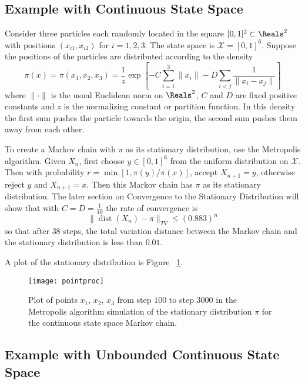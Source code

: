 \documentclass[12pt]{article}
\begin{document}
\subsection*{Example with Continuous State Space}

Consider three particles each randomly located in the square \( [0,1]^2
\subset \Reals^2 \) with positions \( (x_{i1}, x_{i2}) \) for \( i =
1,2,3 \). The state space is \( \mathcal{X} = [0,1]^6 \).  Suppose the
positions of the particles are distributed according to the density
\[
    \pi(x) = \pi(x_1,x_2,x_3) = \frac{1}{z} \exp\left[ -C \sum\limits_{i=1}^3
    \|x_i\| - D \sum\limits_{i<j} \frac{1}{\| x_i - x_j \|} \right]
\] where \( \| \cdot \| \) is the usual Euclidean norm on \( \Reals^2 \),
\( C \) and \( D \) are fixed positive constants and \( z \) is the
normalizing constant or partition function.  In this density the first
sum pushes the particle towards the origin, the second sum pushes them
away from each other.

To create a Markov chain with \( \pi \) as its stationary distribution,
use the Metropolis algorithm. Given \( X_n \), first choose \( y \in [0,1]^6
\) from the uniform distribution on \( \mathcal{X} \).  Then with
probability \( r = \min[1, \pi(y)/\pi(x)] \), accept \( X_{n+1} = y \),
otherwise reject \( y \) and \( X_{n+1} = x \).  Then this Markov chain
has \( \pi \) as its stationary distribution.  The later section on
Convergence to the Stationary Distribution will show that with \( C = D
= \frac{1}{10} \) the rate of convergence is
\[
    \|
    \operatorname{dist}
    (X_n) - \pi \|_{TV} \le (0.883)^n
\] so that after \( 38 \) steps, the total variation distance between
the Markov chain and the stationary distribution is less than \( 0.01 \).

A plot of the stationary distribution is Figure~%
\ref{fig:montecarlo:pointproc}.

\begin{figure}
    \centering

    \caption{Plot of points \( x_1 \), \( x_2 \), \( x_3 \) from step \(
    100 \) to step \( 3000 \) in the Metropolis algorithm simulation of
    the stationary distribution \( \pi \) for the continuous state space
    Markov chain.  }%
    \label{fig:montecarlo:pointproc} \texttt{[image: pointproc]}

\end{figure}

\subsection*{Example with Unbounded Continuous State Space}
\end{document}
